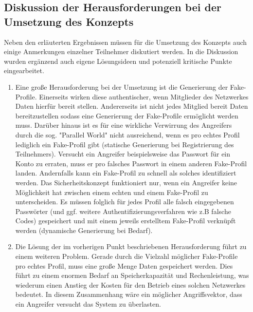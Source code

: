 \documentclass{sigchi}
\begin{document}
\subsection{Diskussion der Herausforderungen bei der Umsetzung des Konzepts}
\label{Diskussion}

Neben den erläuterten Ergebnissen müssen für die Umsetzung des Konzepts auch einige Anmerkungen einzelner Teilnehmer diskutiert werden. In die Diskussion wurden ergänzend auch eigene Lösungsideen und potenziell kritische Punkte eingearbeitet.

\begin{enumerate}
	
	\item Eine große Herausforderung bei der Umsetzung ist die Generierung der Fake-Profile. Einerseits wirken diese authentischer, wenn Mitglieder des Netzwerkes Daten hierfür bereit stellen. Andererseits ist nicht jedes Mitglied bereit Daten bereitzustellen sodass eine Generierung der Fake-Profile ermöglicht werden muss. Darüber hinaus ist es für eine wirkliche Verwirrung des Angreifers durch die sog. "Parallel World" nicht ausreichend, wenn es pro echtes Profil lediglich ein Fake-Profil gibt (statische Generierung bei Registrierung des Teilnehmers). Versucht ein Angreifer beispielsweise das Passwort für ein Konto zu erraten, muss er pro falsches Passwort in einem anderen Fake-Profil landen. Andernfalls kann ein Fake-Profil zu schnell als solches identifiziert werden. Das Sicherheitskonzept funktioniert nur, wenn ein Angreifer keine Möglichkeit hat zwischen einem echten und einem Fake-Profil zu unterscheiden. Es müssen folglich für jedes Profil alle falsch eingegebenen Passwörter (und ggf. weitere Authentifizierungsverfahren wie z.B falsche Codes) gespeichert und mit einem jeweils erstelltem Fake-Profil verknüpft werden (dynamische Generierung bei Bedarf).
	\item Die Lösung der im vorherigen Punkt beschriebenen Herausforderung führt zu einem weiteren Problem. Gerade durch die Vielzahl möglicher Fake-Profile pro echtes Profil, muss eine große Menge Daten gespeichert werden. Dies führt zu einem enormen Bedarf an Speicherkapazität und Rechenleistung, was wiederum einen Anstieg der Kosten für den Betrieb eines solchen Netzwerkes bedeutet. In diesem Zusammenhang wäre ein möglicher Angriffsvektor, dass ein Angreifer versucht das System zu überlasten. 

\end{enumerate}
\end{document}
